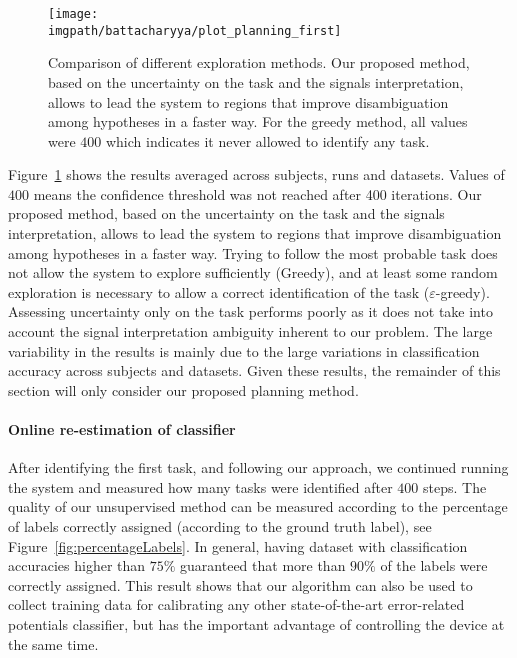 \begin{figure}[!ht]
    \centering
    \texttt{[image: \\imgpath/battacharyya/plot\_planning\_first]}
    \caption{Comparison of different exploration methods. Our proposed method, based on the uncertainty on the task and the signals interpretation, allows to lead the system to regions that improve disambiguation among hypotheses in a faster way. For the greedy method, all values were $400$ which indicates it never allowed to identify any task.}
    \label{fig:compplan}
\end{figure}

Figure~\ref{fig:compplan} shows the results averaged across subjects, runs and datasets. Values of $400$ means the confidence threshold was not reached after 400 iterations. Our proposed method, based on the uncertainty on the task and the signals interpretation, allows to lead the system to regions that improve disambiguation among hypotheses in a faster way. Trying to follow the most probable task does not allow the system to explore sufficiently (Greedy), and at least some random exploration is necessary to allow a correct identification of the task ($\varepsilon$-greedy). Assessing uncertainty only on the task performs poorly as it does not take into account the signal interpretation ambiguity inherent to our problem. The large variability in the results is mainly due to the large variations in classification accuracy across subjects and datasets. Given these results, the remainder of this section will only consider our proposed planning method.

\paragraph{Online re-estimation of classifier}
After identifying the first task, and following our approach, we continued running the system and measured how many tasks were identified after $400$ steps. The quality of our unsupervised method can be measured according to the percentage of labels correctly assigned (according to the ground truth label), see Figure~\ref{fig:percentageLabels}. In general, having dataset with classification accuracies higher than $75\%$ guaranteed that more than $90\%$ of the labels were correctly assigned. This result shows that our algorithm can also be used to collect training data for calibrating any other state-of-the-art error-related potentials classifier, but has the important advantage of controlling the device at the same time.

